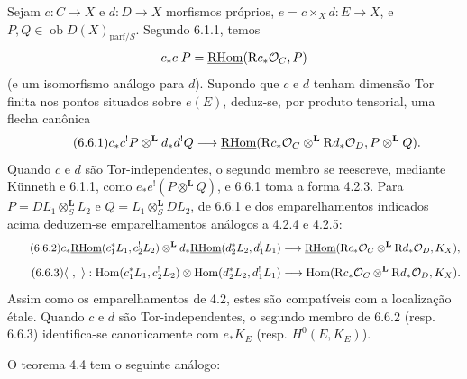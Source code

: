 Sejam $c:C\to X$ e $d:D\to X$ morfismos próprios, $e=c\times_Xd:E\to X$, e $P,Q\in\operatorname{ob}D(X)_{\mathrm{parf}/S}$. Segundo 6.1.1, temos
\[
c_*c^!P=\underline{\mathrm{RHom}}(\mathrm{R} c_*\mathcal{O}_C,P)
\]
(e um isomorfismo análogo para $d$). Supondo que $c$ e $d$ tenham dimensão Tor finita nos pontos situados sobre $e(E)$, deduz-se, por produto tensorial, uma flecha canônica
\begin{equation}
\tag{6.6.1}
c_*c^!P\otimes^{\mathbf L}d_*d^!Q\longrightarrow
\underline{\mathrm{RHom}}(\mathrm{R} c_*\mathcal{O}_C\otimes^{\mathbf L}\mathrm{R} d_*\mathcal{O}_D,P\otimes^{\mathbf L}Q).
\end{equation}
Quando $c$ e $d$ são Tor-independentes, o segundo membro se reescreve, mediante Künneth e 6.1.1, como $e_*e^!(P\otimes^{\mathbf L}Q)$, e 6.6.1 toma a forma 4.2.3. Para $P=DL_1\otimes_S^{\mathbf L}L_2$ e $Q=L_1\otimes_S^{\mathbf L}DL_2$, de 6.6.1 e dos emparelhamentos indicados acima deduzem-se emparelhamentos análogos a 4.2.4 e 4.2.5:
\begin{equation}
\tag{6.6.2}
c_*\underline{\mathrm{RHom}}(c_1^*L_1,c_2^!L_2)\otimes^{\mathbf L}d_*\underline{\mathrm{RHom}}(d_2^*L_2,d_1^!L_1)
\longrightarrow\underline{\mathrm{RHom}}(\mathrm{R} c_*\mathcal{O}_C\otimes^{\mathbf L}\mathrm{R} d_*\mathcal{O}_D,K_X),
\end{equation}
\begin{equation}
\tag{6.6.3}
\langle\ ,\ \rangle:\Hom(c_1^*L_1,c_2^!L_2)\otimes\Hom(d_2^*L_2,d_1^!L_1)
\longrightarrow\Hom(\R c_*\cO_C\otimes^{\mathbf L}\R d_*\cO_D,K_X).
\end{equation}
Assim como os emparelhamentos de 4.2, estes são compatíveis com a localização étale. Quando $c$ e $d$ são Tor-independentes, o segundo membro de 6.6.2 (resp. 6.6.3) identifica-se canonicamente com $e_*K_E$ (resp. $H^0(E,K_E)$).

O teorema 4.4 tem o seguinte análogo:
 
